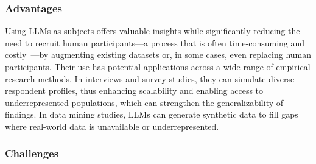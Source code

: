 \subsubsection{Advantages}

Using LLMs as subjects offers valuable insights while significantly reducing the need to recruit human participants—a process that is often time-consuming and costly~\cite{DBLP:conf/vl/Madampe0HO24}—by augmenting existing datasets or, in some cases, even replacing human participants. 
Their use has potential applications across a wide range of empirical research methods.
In interviews and survey studies, they can simulate diverse respondent profiles, thus enhancing scalability and enabling access to underrepresented populations, which can strengthen the generalizability of findings. 
In data mining studies, LLMs can generate synthetic data to fill gaps where real-world data is unavailable or underrepresented.

\subsubsection{Challenges}

